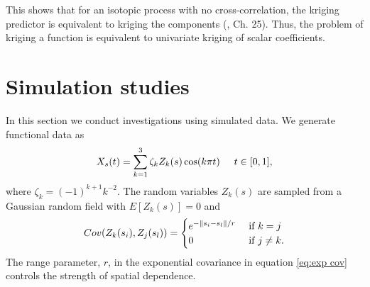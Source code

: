 This shows that for an isotopic process with no cross-correlation, the kriging predictor is equivalent to kriging the components (\cite{wackernagel2003multivariate}, Ch. 25). Thus, the problem of kriging a function is equivalent to univariate kriging of scalar coefficients. 

	



\section{Simulation studies} 

\label{sec:numerical_experiments}

In this section we conduct investigations using simulated data. We generate functional data as
\begin{equation}\label{eq:sim process2} 
	X_s(t) = \sum^{3}_{k=1}\zeta_k Z_k(s) \cos(k\pi t) \hspace{0.5cm} t \in [0,1], 
\end{equation}
where \(\zeta_k=(-1)^{k+1}k^{-2}\). The random variables $Z_k(s)$ are sampled from a Gaussian random field with $E[Z_k(s)]=0$ and 
\begin{equation}\label{eq:exp cov}
	Cov(Z_k(s_i), Z_j(s_l)) = \begin{cases} 
																e^{-\left\|s_i - s_l\right\|/r} &\mbox{ if } k = j\\
																0 & \mbox{ if } j \neq k.
															\end{cases}
\end{equation} 
The range parameter, $r$, in the exponential covariance in equation \eqref{eq:exp cov} controls the strength of spatial dependence. 

